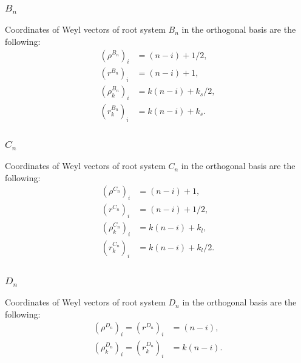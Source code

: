 \documentclass{article}
\begin{document}
\subsubsection{$B_n$}
Coordinates of Weyl vectors of root system $B_n$ in the orthogonal basis are the following:
\begin{equation}
    \begin{aligned}
        \left (\rho^{B_n} \right)_i &= (n-i)+1/2, \\
        \left (r^{B_n} \right)_i &= (n-i)+1,  \\
        \left (\rho^{B_n}_k \right)_i & = k(n-i)+k_s/2, \\
        \left (r^{B_n}_k \right)_i &= k(n-i)+k_s.  \\
    \end{aligned}
\end{equation}

\subsubsection{$C_n$}
Coordinates of Weyl vectors of root system $C_n$ in the orthogonal basis are the following:
\begin{equation}
    \begin{aligned}
        \left (\rho^{C_n} \right)_i &= (n-i)+1, \\
        \left (r^{C_n} \right)_i &= (n-i)+1/2,  \\
        \left (\rho^{C_n}_k \right)_i & = k(n-i)+k_l, \\
        \left (r^{C_n}_k \right)_i &= k(n-i)+k_l/2.  \\
    \end{aligned}
\end{equation}

\subsubsection{$D_n$}
Coordinates of Weyl vectors of root system $D_n$ in the orthogonal basis are the following:
\begin{equation}
    \begin{aligned}
        \left (\rho^{D_n} \right)_i=\left (r^{D_n} \right)_i &= (n-i), \\
        \left (\rho^{D_n}_k \right)_i= \left (r^{D_n}_k \right)_i & = k(n-i). \\
    \end{aligned}
\end{equation}
\end{document}
